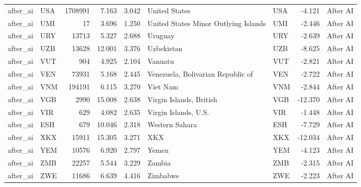 \begin{tabular}{llrrrllrl}
after\_ai & USA & 1708991 & 7.163 & 3.042 & United States & USA & -4.121 & After AI \\
after\_ai & UMI & 17 & 3.696 & 1.250 & United States Minor Outlying Islands & UMI & -2.446 & After AI \\
after\_ai & URY & 13713 & 5.327 & 2.688 & Uruguay & URY & -2.639 & After AI \\
after\_ai & UZB & 13628 & 12.001 & 3.376 & Uzbekistan & UZB & -8.625 & After AI \\
after\_ai & VUT & 904 & 4.925 & 2.104 & Vanuatu & VUT & -2.821 & After AI \\
after\_ai & VEN & 73931 & 5.168 & 2.445 & Venezuela, Bolivarian Republic of & VEN & -2.722 & After AI \\
after\_ai & VNM & 194191 & 6.115 & 3.270 & Viet Nam & VNM & -2.844 & After AI \\
after\_ai & VGB & 2990 & 15.008 & 2.638 & Virgin Islands, British & VGB & -12.370 & After AI \\
after\_ai & VIR & 629 & 4.082 & 2.635 & Virgin Islands, U.S. & VIR & -1.448 & After AI \\
after\_ai & ESH & 679 & 10.046 & 2.318 & Western Sahara & ESH & -7.729 & After AI \\
after\_ai & XKX & 15911 & 15.305 & 3.271 & XKX & XKX & -12.034 & After AI \\
after\_ai & YEM & 10576 & 6.920 & 2.797 & Yemen & YEM & -4.123 & After AI \\
after\_ai & ZMB & 22257 & 5.544 & 3.229 & Zambia & ZMB & -2.315 & After AI \\
after\_ai & ZWE & 11686 & 6.639 & 4.416 & Zimbabwe & ZWE & -2.223 & After AI \\
\bottomrule
\end{tabular}
